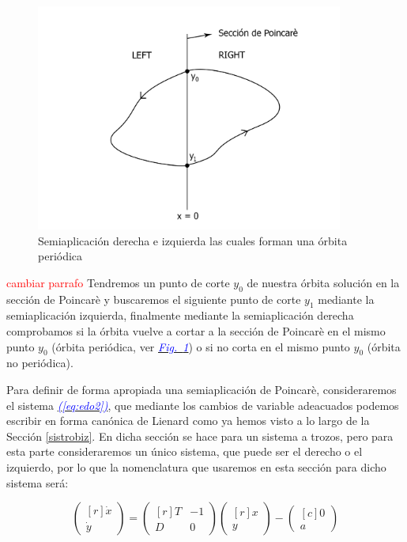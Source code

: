 \documentclass[12pt,a4paper]{report} %
\newcommand{\fref}[1]{\hyperref[#1]{\textcolor{blue}{\textit{Fig.~\ref*{#1}}}}}
\newcommand{\eref}[1]{\hyperref[#1]{\textcolor{blue}{\textit{(\ref*{#1})}}}}
\begin{document}
	\begin{figure}[h]
		\centering
		\includegraphics[width=0.9\textwidth]{poincaLR.jpg}
		\caption{Semiaplicación derecha e izquierda las cuales forman una órbita periódica}
		\label{fig:poincaLR}
	\end{figure}\smallskip
	
	\textcolor{red}{cambiar parrafo}
	Tendremos un punto de corte $y_0$ de nuestra órbita solución en la sección de Poincarè y buscaremos el siguiente punto de corte $y_1$ mediante la semiaplicación izquierda, finalmente mediante la semiaplicación derecha comprobamos si la órbita vuelve a cortar a la sección de Poincarè en el mismo punto $y_0$ (órbita periódica, ver \fref{fig:poincaLR}) o si no corta en el mismo punto $y_0$ (órbita no periódica).
	
	\vspace{0.5cm}Para definir de forma apropiada una semiaplicación de Poincarè, consideraremos el sistema \eref{eq:edo2}, que mediante los cambios de variable adeacuados podemos escribir en forma canónica de Lienard como ya hemos visto a lo largo de la Sección \ref{sistrobiz}. En dicha sección se hace para un sistema a trozos, pero para esta parte consideraremos un único sistema, que puede ser el derecho o el izquierdo, por lo que la nomenclatura que usaremos en esta sección para dicho sistema será:
	
		\begin{equation}
		\label{eq:lienardsolo}
		\begin{pmatrix*}[r]
			\dot{x}\\ \dot{y}
		\end{pmatrix*}= \begin{pmatrix*}[r]
			T & -1 \\ D & 0
		\end{pmatrix*} \begin{pmatrix*}[r]
			x \\ y
		\end{pmatrix*}-\begin{pmatrix*}[c]
			0 \\ a
		\end{pmatrix*}
	\end{equation}\smallskip
	\newpage
	
\end{document}
